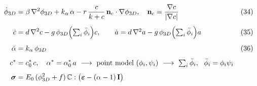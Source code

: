 \documentclass[border=4pt,varwidth=\maxdimen]{standalone}
\begin{document}
\fontsize{14}{20}\selectfont
$\begin{aligned}
\dot\phi_{3D}&=\beta\,\nabla^2\phi_{3D}+k_\alpha\,\alpha-r\,\frac{c}{k+c}\,\mathbf n_c\cdot\nabla\phi_{3D},\quad \mathbf n_c=\frac{\nabla c}{|\nabla c|} &&\text{(34)}\\[4pt]
\dot c&=d\,\nabla^2c-g\,\phi_{3D}\Bigl(\textstyle\sum_i\bar\phi_i\Bigr)c,\qquad \dot a=d\,\nabla^2a-g\,\phi_{3D}\Bigl(\textstyle\sum_i\bar\phi_i\Bigr)a &&\text{(35)}\\[4pt]
\dot\alpha&=k_\alpha\,\phi_{3D} &&\text{(36)}\\[4pt]
c^*&=c^*_0\,c,\quad \alpha^*=\alpha^*_0\,a\ \longrightarrow\ \text{point model }(\phi_i,\psi_i)\ \longrightarrow\ \textstyle\sum_i\bar\phi_i,\ \ \bar\phi_i=\phi_i\psi_i &&\\[4pt]
\boldsymbol\sigma&=E_0\,(\phi_{3D}^2+f)\,\mathbb C:\bigl(\boldsymbol\varepsilon-(\alpha-1)\,\mathbf I\bigr) &&
\end{aligned}$
\end{document}
